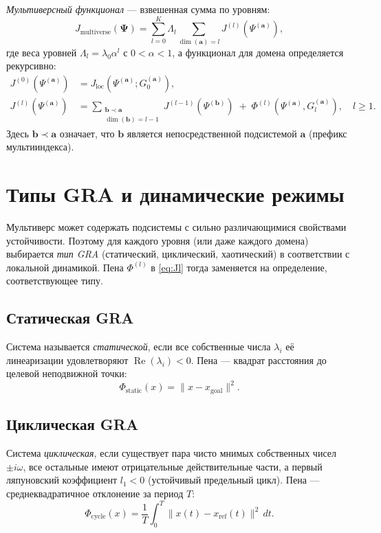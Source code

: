 \documentclass[12pt,a4paper]{article}
\begin{document}
\emph{Мультиверсный функционал} — взвешенная сумма по уровням:
\begin{equation}\label{eq:Jtotal}
J_{\text{multiverse}}(\mathbf{\Psi}) = \sum_{l=0}^{K} \Lambda_l \sum_{\dim(\mathbf{a})=l} J^{(l)}(\Psi^{(\mathbf{a})}),
\end{equation}
где веса уровней $\Lambda_l = \lambda_0 \alpha^l$ с $0<\alpha<1$, а функционал для домена определяется рекурсивно:
\begin{align}
J^{(0)}(\Psi^{(\mathbf{a})}) &= J_{\text{loc}}(\Psi^{(\mathbf{a})}; G_0^{(\mathbf{a})}),\label{eq:J0}\\
J^{(l)}(\Psi^{(\mathbf{a})}) &= \sum_{\substack{\mathbf{b}\prec\mathbf{a}\\ \dim(\mathbf{b})=l-1}} J^{(l-1)}(\Psi^{(\mathbf{b})}) \;+\; \Phi^{(l)}(\Psi^{(\mathbf{a})}, G_l^{(\mathbf{a})}),\quad l\ge 1.\label{eq:Jl}
\end{align}
Здесь $\mathbf{b}\prec\mathbf{a}$ означает, что $\mathbf{b}$ является непосредственной подсистемой $\mathbf{a}$ (префикс мультииндекса).

\section{Типы GRA и динамические режимы}
Мультиверс может содержать подсистемы с сильно различающимися свойствами устойчивости. Поэтому для каждого уровня (или даже каждого домена) выбирается \emph{тип GRA} (статический, циклический, хаотический) в соответствии с локальной динамикой. Пена $\Phi^{(l)}$ в \eqref{eq:Jl} тогда заменяется на определение, соответствующее типу.

\subsection{Статическая GRA}
Система называется \emph{статической}, если все собственные числа $\lambda_i$ её линеаризации удовлетворяют $\operatorname{Re}(\lambda_i)<0$. Пена — квадрат расстояния до целевой неподвижной точки:
\begin{equation}
\Phi_{\text{static}}(x) = \|x - x_{\text{goal}}\|^2.
\end{equation}

\subsection{Циклическая GRA}
Система \emph{циклическая}, если существует пара чисто мнимых собственных чисел $\pm i\omega$, все остальные имеют отрицательные действительные части, а первый ляпуновский коэффициент $l_1<0$ (устойчивый предельный цикл). Пена — среднеквадратичное отклонение за период $T$:
\begin{equation}
\Phi_{\text{cycle}}(x) = \frac{1}{T}\int_0^T \|x(t) - x_{\text{ref}}(t)\|^2\,dt.
\end{equation}
\end{document}

